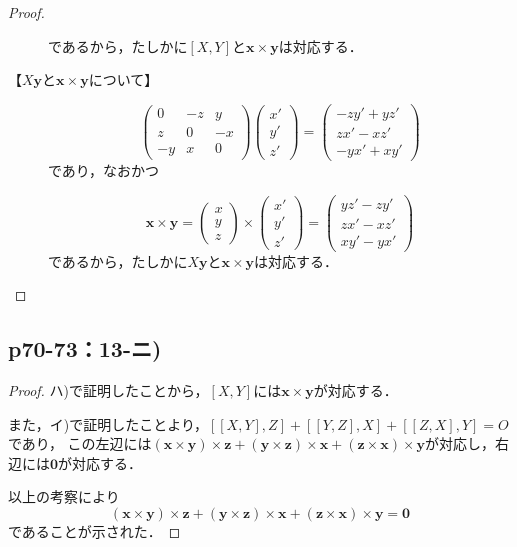 \documentclass[uplatex,dvipdfmx,a4paper,10pt,fleqn]{jsarticle}
\begin{document}
\begin{leftbar}
\begin{proof}
\begin{description}
\[        \]
        であるから，たしかに$[X,Y]$と$\bm{x} \times \bm{y}$は対応する．
        \item[【$X\bm{y}$と$\bm{x}\times\bm{y}$について】]
        \[
            \begin{pmatrix} 0 & -z & y \\ z & 0 & -x \\ -y & x & 0 \end{pmatrix} \begin{pmatrix} x' \\ y' \\ z' \end{pmatrix} = \begin{pmatrix} -zy'+yz' \\ zx'-xz' \\ -yx'+xy' \end{pmatrix}
        \]
        であり，なおかつ
   
        \[
            \bm{x}\times \bm{y} = \begin{pmatrix} x \\ y \\ z \end{pmatrix} \times \begin{pmatrix} x' \\ y ' \\ z' \end{pmatrix} = \begin{pmatrix} yz'-zy' \\ zx'-xz' \\ xy'-yx' \end{pmatrix}
        \]
        であるから，たしかに$X\bm{y}$と$\bm{x} \times \bm{y}$は対応する．
    \end{description}
    \end{proof}
    \end{leftbar}
    

    \subsection*{p70-73：13-ニ)}

    \begin{tleftbar}
        \begin{proof}
            ハ)で証明したことから，$[X,Y]$には$\bm{x} \times \bm{y}$が対応する．

            また，イ)で証明したことより，$[[X,Y],Z] +[[Y,Z],X]+[[Z,X],Y]=O$であり，
            この左辺には$(\bm{x}\times\bm{y}) \times \bm{z} + (\bm{y}\times\bm{z}) \times \bm{x} + (\bm{z}\times\bm{x}) \times \bm{y}$が対応し，右辺には$\bm{0}$が対応する．

            以上の考察により
            \[
                (\bm{x}\times\bm{y}) \times \bm{z} + (\bm{y}\times\bm{z}) \times \bm{x} + (\bm{z}\times\bm{x}) \times \bm{y} =\bm{0}
            \]
            であることが示された．
        \end{proof}
    \end{tleftbar}
\end{document}

